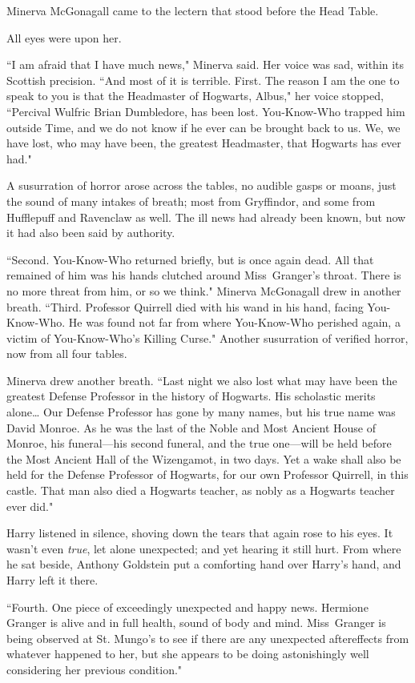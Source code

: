 Minerva McGonagall came to the lectern that stood before the Head Table.

All eyes were upon her.

``I am afraid that I have much news," Minerva said. Her voice was sad, within its Scottish precision. ``And most of it is terrible. First. The reason I am the one to speak to you is that the Headmaster of Hogwarts, Albus," her voice stopped, ``Percival Wulfric Brian Dumbledore, has been lost. You-Know-Who trapped him outside Time, and we do not know if he ever can be brought back to us. We, we have lost, who may have been, the greatest Headmaster, that Hogwarts has ever had."

A susurration of horror arose across the tables, no audible gasps or moans, just the sound of many intakes of breath; most from Gryffindor, and some from Hufflepuff and Ravenclaw as well. The ill news had already been known, but now it had also been said by authority.

``Second. You-Know-Who returned briefly, but is once again dead. All that remained of him was his hands clutched around Miss~Granger's throat. There is no more threat from him, or so we think." Minerva McGonagall drew in another breath. ``Third. Professor Quirrell died with his wand in his hand, facing You-Know-Who. He was found not far from where You-Know-Who perished again, a victim of You-Know-Who's Killing Curse." Another susurration of verified horror, now from all four tables.

Minerva drew another breath. ``Last night we also lost what may have been the greatest Defense Professor in the history of Hogwarts. His scholastic merits alone{\ldots} Our Defense Professor has gone by many names, but his true name was David Monroe. As he was the last of the Noble and Most Ancient House of Monroe, his funeral---his second funeral, and the true one---will be held before the Most Ancient Hall of the Wizengamot, in two days. Yet a wake shall also be held for the Defense Professor of Hogwarts, for our own Professor Quirrell, in this castle. That man also died a Hogwarts teacher, as nobly as a Hogwarts teacher ever did."

Harry listened in silence, shoving down the tears that again rose to his eyes. It wasn't even \emph{true}, let alone unexpected; and yet hearing it still hurt. From where he sat beside, Anthony Goldstein put a comforting hand over Harry's hand, and Harry left it there.

``Fourth. One piece of exceedingly unexpected and happy news. Hermione Granger is alive and in full health, sound of body and mind. Miss~Granger is being observed at St. Mungo's to see if there are any unexpected aftereffects from whatever happened to her, but she appears to be doing astonishingly well considering her previous condition."

